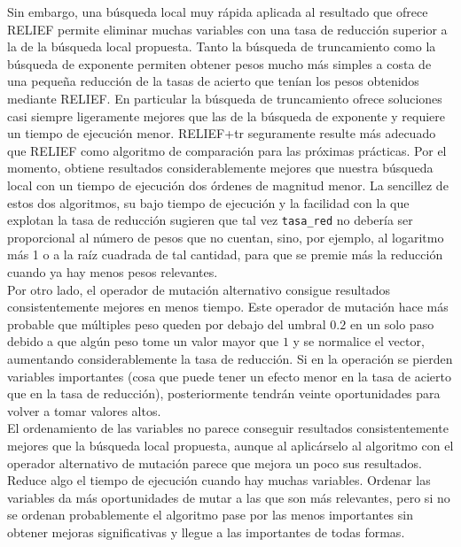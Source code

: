 \documentclass{article}
\begin{document}
Sin embargo, una búsqueda local muy rápida aplicada al resultado que ofrece RELIEF permite eliminar muchas variables con una tasa de reducción superior a la de la búsqueda local propuesta. Tanto la búsqueda de truncamiento como la búsqueda de exponente permiten obtener pesos mucho más simples a costa de una pequeña reducción de la tasas de acierto que tenían los pesos obtenidos mediante RELIEF. En particular la búsqueda de truncamiento ofrece soluciones casi siempre ligeramente mejores que las de la búsqueda de exponente y requiere un tiempo de ejecución menor. RELIEF+tr seguramente resulte más adecuado que RELIEF como algoritmo de comparación para las próximas prácticas. Por el momento, obtiene resultados considerablemente mejores que nuestra búsqueda local con un tiempo de ejecución dos órdenes de magnitud menor. La sencillez de estos dos algoritmos, su bajo tiempo de ejecución y la facilidad con la que explotan la tasa de reducción sugieren que tal vez \texttt{tasa\_red} no debería ser proporcional al número de pesos que no cuentan, sino, por ejemplo, al logaritmo más 1 o a la raíz cuadrada de tal cantidad, para que se premie más la reducción cuando ya hay menos pesos relevantes. \\

Por otro lado, el operador de mutación alternativo consigue resultados consistentemente mejores en menos tiempo. Este operador de mutación hace más probable que múltiples peso queden por debajo del umbral $0.2$ en un solo paso debido a que algún peso tome un valor mayor que $1$ y se normalice el vector, aumentando considerablemente la tasa de reducción. Si en la operación se pierden variables importantes (cosa que puede tener un efecto menor en la tasa de acierto que en la tasa de reducción), posteriormente tendrán veinte oportunidades para volver a tomar valores altos. \\

El ordenamiento de las variables no parece conseguir resultados consistentemente mejores que la búsqueda local propuesta, aunque al aplicárselo al algoritmo con el operador alternativo de mutación parece que mejora un poco sus resultados. Reduce algo el tiempo de ejecución cuando hay muchas variables. Ordenar las variables da más oportunidades de mutar a las que son más relevantes, pero si no se ordenan probablemente el algoritmo pase por las menos importantes sin obtener mejoras significativas y llegue a las importantes de todas formas.
\end{document}
